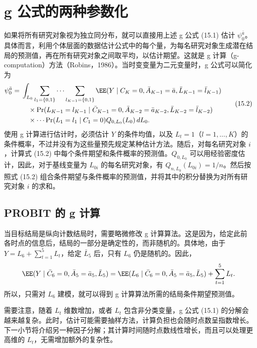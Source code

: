 \section{g 公式的两种参数化}

如果将所有研究对象视为独立同分布，就可以直接用上述 g 公式 (15.1) 估计 $\psi_0^{\bar a}$。具体而言，利用个体层面的数据估计公式中的每个量，为每名研究对象生成潜在结局的预测值，再在所有研究对象之间取平均，以估计期望。这就是 g 计算（g-computation）方法（Robins，1986）。当时变变量为二元变量时，g 公式可以简化为
\begin{equation}
\begin{aligned}
 \psi_0^{\bar a}={}&\int_{L_0}\sum_{l_1=\{0,1\}}\cdots\sum_{l_{K-1}=\{0,1\}}
 \EE(Y\mid C_K=0,\bar A_{K-1}=\bar a,\bar L_{K-1}=\bar l_{K-1})\\
 &\quad\times\Pr(L_{K-1}=l_{K-1}\mid\bar C_{K-1}=0,
 \bar A_{K-2}=\bar a_{K-2},\bar L_{K-2}=\bar l_{K-2})\\
 &\quad\times\cdots\Pr(L_1=l_1\mid C_1=0)Q_{0,L_0}(L_0)\,dL_0.
\end{aligned}
\tag{15.2}
\end{equation}
使用 g 计算进行估计时，必须估计 $Y$ 的条件均值，以及 $L_t=1$（$l=1,\ldots,K$）的条件概率，不过并没有为这些量预先规定某种估计方法。随后，对每名研究对象 $i$，计算式 (15.2) 中每个条件期望和条件概率的预测值。$Q_{0,L_0}$ 可以用经验密度估计，因此，对于基线变量为 $L_{0i}$ 的每名研究对象，有 $Q_{n,L_0}(L_{0i})=1/n$。然后按照式 (15.2) 组合条件期望与条件概率的预测值，并将其中的积分替换为对所有研究对象 $i$ 的求和。

\subsection{PROBIT 的 g 计算}

当目标结局是纵向计数结局时，需要略微修改 g 计算算法。这是因为，给定此前各时点的信息后，结局的一部分是确定性的，而非随机的。具体地，由于 $Y=L_6+\sum_{t=1}^{5}L_t$，给定 $\bar L_5$ 后，只有 $L_6$ 仍是随机的。因此，
\[
 \EE(Y\mid\bar C_6=0,\bar A_5=\bar a_5,\bar L_5)
 =\EE(L_6\mid\bar C_6=0,\bar A_5=\bar a_5,\bar L_5)+\sum_{t=1}^{5}L_t.
\]
所以，只需对 $L_6$ 建模，就可以得到 g 计算算法所需的结局条件期望预测值。

需要注意，随着 $L_t$ 维数增加，或者 $L_t$ 包含非分类变量，g 公式 (15.1) 的分解会越来越复杂。此时，估计可能需要抽样方法，计算负担也会随时点数呈指数增长。下一小节将介绍另一种因子分解；其计算时间随时点数线性增长，而且可以处理更高维的 $L_t$，无需增加额外的复杂性。

